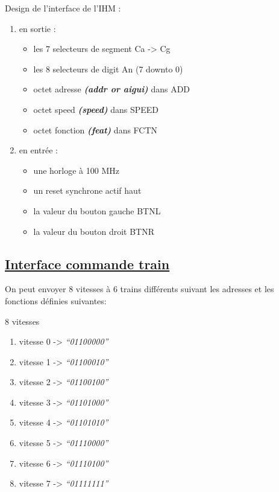 \hrulefill

Design de l'interface de l'IHM :
\begin{enumerate}
\item en sortie :
  \begin{itemize}  
  \item les 7 selecteurs de segment Ca -> Cg
  \item les 8 selecteurs de digit   An (7 downto 0)
  \item octet adresse \textbf{\emph{(addr or aigui)}}  dans ADD
  \item octet speed \textbf{\emph{(speed)}}  dans SPEED
  \item octet fonction \textbf{\emph{(feat)}}  dans FCTN    
  \end{itemize}  
\item en entrée :
  \begin{itemize}  
  \item une horloge à 100 MHz
  \item un reset synchrone actif haut 
  \item la valeur du bouton gauche BTNL
  \item la valeur du bouton droit BTNR    
  \end{itemize}  
\end{enumerate}

\subsection{\underline{Interface commande train}}
\label{sec:ihm-train}
On peut envoyer 8 vitesses à 6 trains différents suivant les adresses  et les fonctions définies suivantes:
\bigskip

8 vitesses
\begin {enumerate}
\item vitesse 0 -> \emph{``01100000''}
\item vitesse 1 -> \emph{``01100010''}
\item vitesse 2 -> \emph{``01100100''}
\item vitesse 3 -> \emph{``01101000''}
\item vitesse 4 -> \emph{``01101010''}
\item vitesse 5 -> \emph{``01110000''}
\item vitesse 6 -> \emph{``01110100''}
\item vitesse 7 -> \emph{``01111111''}
\end {enumerate}  

\bigskip

